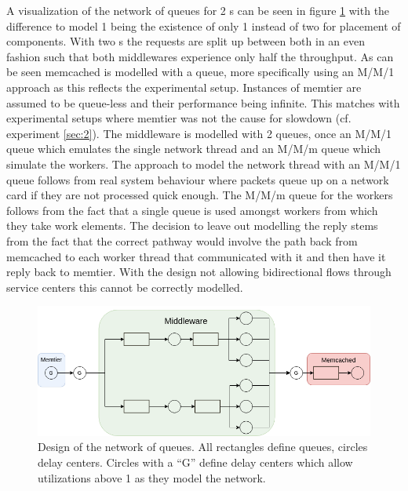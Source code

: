             A visualization of the network of queues for 2 \mw{}s can be seen in figure \ref{fig:noq_2mw} with the
            difference to model 1 being the existence of only 1 \mw{} instead of two for placement of components. With
            two \mw{}s the requests are split up between both in an even fashion such that both middlewares experience
            only half the throughput.\newline
            As can be seen memcached is modelled with a queue, more specifically using an M/M/1 approach as this reflects
            the experimental setup. Instances of memtier are assumed to be queue-less and their performance being
            infinite. This matches with experimental setups where memtier was not the cause for slowdown (cf. experiment
            \ref{sec:2}). The middleware is modelled with 2 queues, once an M/M/1 queue which emulates the single network
            thread and an M/M/m queue which simulate the workers. The approach to model the network thread with an M/M/1
            queue follows from real system behaviour where packets queue up on a network card if they are not processed
            quick enough. The M/M/m queue for the workers follows from the fact that a single queue is used amongst
            workers from which they take work elements. The decision to leave out modelling the reply stems from the
            fact that the correct pathway would involve the path back from memcached to each worker thread that
            communicated with it and then have it reply back to memtier. With the design not allowing bidirectional
            flows through service centers this cannot be correctly modelled.

            \begin{figure}
                \includegraphics[width=0.7\linewidth]{graphics/network-of-queues_2-middlewares.png}
                \caption{Design of the network of queues. All rectangles define queues, circles delay centers. Circles
                         with a ``G'' define delay centers which allow utilizations above 1 as they model the
                         network.\label{fig:noq_2mw}}
            \end{figure}

